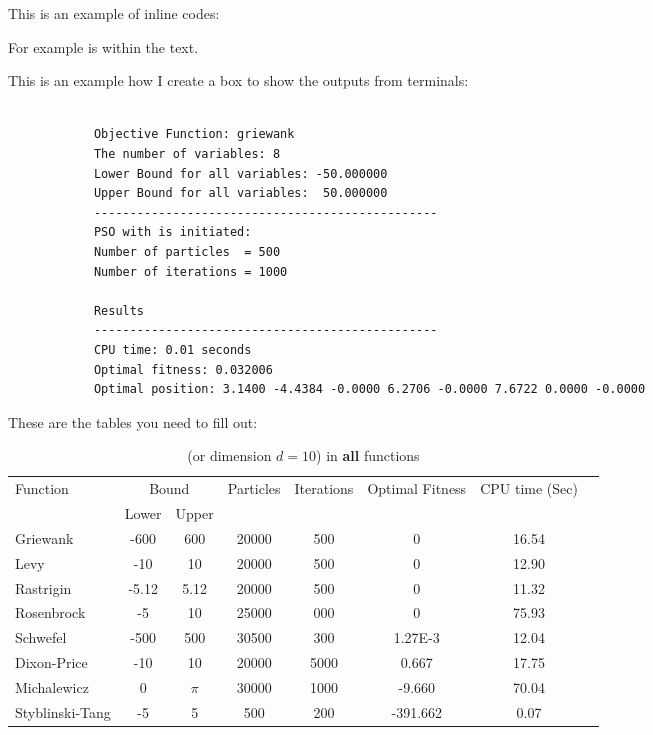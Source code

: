 \documentclass[12pt]{article}
\begin{document}
	
	
	
	
	This is an example of inline codes:
	
	{\scriptsize {}}
	
	
	For example  is within the text.
	
	This is an example how I create a box to show the outputs from terminals:
	
	\begin{mdframed}[style=myboxstyleTerminal1]
		\footnotesize
		\begin{verbatim}
			
			Objective Function: griewank
			The number of variables: 8
			Lower Bound for all variables: -50.000000
			Upper Bound for all variables:  50.000000
			------------------------------------------------
			PSO with is initiated:
			Number of particles  = 500
			Number of iterations = 1000 
			
			Results
			------------------------------------------------
			CPU time: 0.01 seconds
			Optimal fitness: 0.032006
			Optimal position: 3.1400 -4.4384 -0.0000 6.2706 -0.0000 7.6722 0.0000 -0.0000
		\end{verbatim}
	\end{mdframed}
	
	These are the tables you need to fill out:
	
	\begin{table}[H]
		\caption{ (or dimension $d=10$) in \textbf{all} functions}
		\label{table:1}
		\centering
		\begin{tabular}{l c c c c c c c}
			\hline
			Function &  \multicolumn{2}{c}{Bound} & Particles & Iterations &  Optimal Fitness & CPU time (Sec) \\
			& Lower& Upper&&&\\
			\hline
			Griewank  		&  -600   & 600 	&20000 &500  &0  &16.54 &\\
			Levy 	  		&  -10    & 10 		&20000 &500 &0 &12.90 &\\
			Rastrigin 		&  -5.12  & 5.12 	&20000 &500 &0 &11.32 &\\
			Rosenbrock		&  -5     & 10 		&25000 &000 &0 &75.93 &\\
			Schwefel 	 	&  -500   & 500 	&30500 &300 &1.27E-3 &12.04 &\\
			Dixon-Price 	&   -10	  & 10 		&20000 &5000 &0.667 &17.75 &\\
			Michalewicz 	&   0 	  & $\pi$ 	&30000 &1000 &-9.660 &70.04 &\\
			Styblinski-Tang & -5 	  & 5  		&500 &200 &-391.662 &0.07 &\\
			\hline
		\end{tabular}
	\end{table}
	
\end{document}
